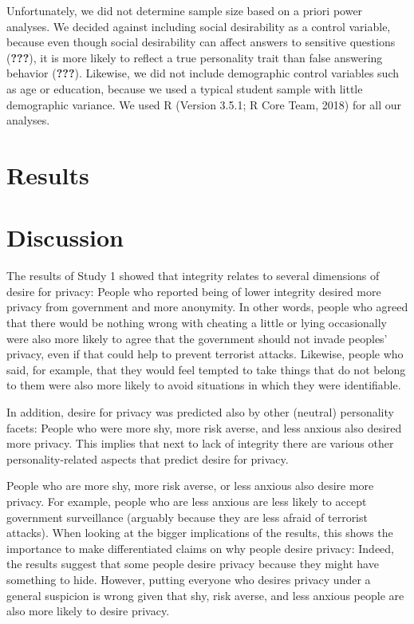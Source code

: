 \documentclass[man]{apa6}
\theoremstyle{definition}
\theoremstyle{definition}
\theoremstyle{definition}
\theoremstyle{remark}
\begin{document}
Unfortunately, we did not determine sample size based on a priori power
analyses. We decided against including social desirability as a control
variable, because even though social desirability can affect answers to
sensitive questions ({\textbf{???}}), it is more likely to reflect a
true personality trait than false answering behavior ({\textbf{???}}).
Likewise, we did not include demographic control variables such as age
or education, because we used a typical student sample with little
demographic variance. We used R (Version 3.5.1; R Core Team, 2018) for
all our analyses.

\hypertarget{results}{%
\section{Results}\label{results}}

\hypertarget{discussion}{%
\section{Discussion}\label{discussion}}

The results of Study 1 showed that integrity relates to several
dimensions of desire for privacy: People who reported being of lower
integrity desired more privacy from government and more anonymity. In
other words, people who agreed that there would be nothing wrong with
cheating a little or lying occasionally were also more likely to agree
that the government should not invade peoples' privacy, even if that
could help to prevent terrorist attacks. Likewise, people who said, for
example, that they would feel tempted to take things that do not belong
to them were also more likely to avoid situations in which they were
identifiable.

In addition, desire for privacy was predicted also by other (neutral)
personality facets: People who were more shy, more risk averse, and less
anxious also desired more privacy. This implies that next to lack of
integrity there are various other personality-related aspects that
predict desire for privacy.

People who are more shy, more risk averse, or less anxious also desire
more privacy. For example, people who are less anxious are less likely
to accept government surveillance (arguably because they are less afraid
of terrorist attacks). When looking at the bigger implications of the
results, this shows the importance to make differentiated claims on why
people desire privacy: Indeed, the results suggest that some people
desire privacy because they might have something to hide. However,
putting everyone who desires privacy under a general suspicion is wrong
given that shy, risk averse, and less anxious people are also more
likely to desire privacy.
\end{document}
